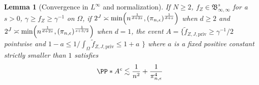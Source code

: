 \documentclass{article}
\newcommand{\DC}{\Dmargincomment}
\newcommand{\1}{\mathds{1}}
\DeclarePairedDelimiter{\paren}{\lparen}{\rparen}
\theoremstyle{plain}
\newtheorem{lemma}{Lemma}[section]
\theoremstyle{definition}
\theoremstyle{remark}
\begin{document}
\begin{lemma}[Convergence in $L^{\infty}$ and normalization]
\label{lemma:control_infty_normalizing}
    If $N \geq 2$, $f_Z \in \mathfrak{B}_{\infty, \infty}^s$ for a $s>0$, $\gamma \geq f_Z \geq \gamma^{-1}$ on $\Omega$, if $2^J \asymp \min \paren*{n^{\frac{1}{d + 2s}}, (\pi_{n,\epsilon})^{\frac{1}{d+s}}}$ when $d \geq 2$ and $2^J \asymp \min \paren*{n^{\frac{1}{d + 2s}}, (\pi_{n,\epsilon})^{\frac{1}{s + 3/2}}}$ when $d=1$, %
    the event $A = \bigl\{ \tilde{f}_{Z, J, \textrm{priv} } \geq \gamma^{-1}/2$ pointwise and $1 - a \leq  1 /\int_{\Omega} \tilde{f}_{Z, J, \textrm{priv} } \leq 1 + a$  $\bigr\}$ where $a$ is a fixed positive constant strictly smaller than $1$ satisfies 
    \begin{equation}
        \PP*{A^c} \lesssim \frac{1}{n^2} + \frac{1}{\pi_{n, \epsilon}^4}
    \end{equation}
\end{lemma}
\end{document}
